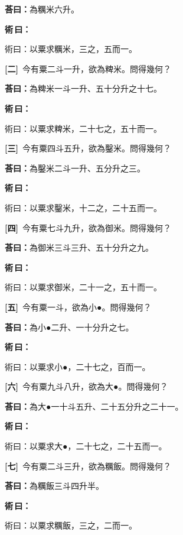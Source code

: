 \documentclass[11pt,a4paper]{article}
\newenvironment{method}{%
  \par\noindent\textcolor{methodcolor}{\textbf{術\,曰：}}%
  \ignorespaces
}{\par\vspace{0.5em}}
\newcommand{\problemnum}[1]{\textbf{[\ignorespaces#1\unskip]}}
\begin{document}
\noindent\textcolor{answercolor}{\textbf{荅曰：}}為糲米六升。

\begin{method}
術曰：以粟求糲米，三之，五而一。
\end{method}

\noindent\problemnum{二}\,
今有粟二斗一升，欲為粺米。問得幾何？

\noindent\textcolor{answercolor}{\textbf{荅曰：}}為粺米一斗一升、五十分升之十七。

\begin{method}
術曰：以粟求粺米，二十七之，五十而一。
\end{method}

\noindent\problemnum{三}\,
今有粟四斗五升，欲為鑿米。問得幾何？

\noindent\textcolor{answercolor}{\textbf{荅曰：}}為鑿米二斗一升、五分升之三。

\begin{method}
術曰：以粟求鑿米，十二之，二十五而一。
\end{method}

\noindent\problemnum{四}\,
今有粟七斗九升，欲為御米。問得幾何？

\noindent\textcolor{answercolor}{\textbf{荅曰：}}為御米三斗三升、五十分升之九。

\begin{method}
術曰：以粟求御米，二十一之，五十而一。
\end{method}

\noindent\problemnum{五}\,
今有粟一斗，欲為小●。問得幾何？

\noindent\textcolor{answercolor}{\textbf{荅曰：}}為小●二升、一十分升之七。

\begin{method}
術曰：以粟求小●，二十七之，百而一。
\end{method}

\noindent\problemnum{六}\,
今有粟九斗八升，欲為大●。問得幾何？

\noindent\textcolor{answercolor}{\textbf{荅曰：}}為大●一十斗五升、二十五分升之二十一。

\begin{method}
術曰：以粟求大●，二十七之，二十五而一。
\end{method}

\noindent\problemnum{七}\,
今有粟二斗三升，欲為糲飯。問得幾何？

\noindent\textcolor{answercolor}{\textbf{荅曰：}}為糲飯三斗四升半。

\begin{method}
術曰：以粟求糲飯，三之，二而一。
\end{method}
\end{document}
